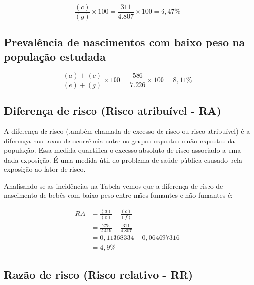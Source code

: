\documentclass[
]{book}
\begin{document}
\hfill\break

\[
\frac{(c)}{(g)} \times 100 = \frac{311}{4.807} \times 100 = 6,47 \%
\]

\hfill\break

\hypertarget{prevaluxeancia-de-nascimentos-com-baixo-peso-na-populauxe7uxe3o-estudada}{%
\subsection{Prevalência de nascimentos com baixo peso na população estudada}\label{prevaluxeancia-de-nascimentos-com-baixo-peso-na-populauxe7uxe3o-estudada}}

\hfill\break

\[
\frac{(a) + (c)}{(e) + (g)} \times 100 = \frac{586}{7.226} \times 100 =  8,11\%
\]

\hfill\break

\hypertarget{diferenuxe7a-de-risco-risco-atribuuxedvel---ra}{%
\subsection{Diferença de risco (Risco atribuível - RA)}\label{diferenuxe7a-de-risco-risco-atribuuxedvel---ra}}

\hfill\break

A diferença de risco (também chamada de excesso de risco ou risco atribuível) é a diferença nas taxas de ocorrência entre os grupos expostos e não expostos da população. Essa medida quantifica o excesso absoluto de risco associado a uma dada exposição. É uma medida útil do problema de saúde pública causado pela exposição ao fator de risco.

\hfill\break

Analisando-se as incidências na Tabela vemos que a diferença de risco de nascimento de bebês com baixo peso entre mães fumantes e não fumantes é:

\hfill\break

\begin{align*}
RA & =\frac{(a)}{(e)} - \frac{(c)}{(f)}  \\
   & = \frac{275}{2.419} - \frac{311}{4.807} \\ 
   & = 0,11368334 - 0,064697316 \\
   & = 4,9 \%
\end{align*}

\hfill\break

\hypertarget{razuxe3o-de-risco-risco-relativo---rr}{%
\subsection{Razão de risco (Risco relativo - RR)}\label{razuxe3o-de-risco-risco-relativo---rr}}
\end{document}
